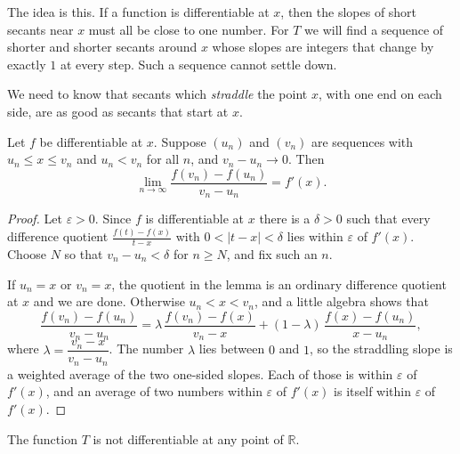 The idea is this.  If a function is differentiable at $x$, then the slopes of short secants near $x$ must all be close to one number.  For $T$ we will find a sequence of shorter and shorter secants around $x$ whose slopes are integers that change by exactly $1$ at every step.  Such a sequence cannot settle down.

We need to know that secants which \emph{straddle} the point $x$, with one end on each side, are as good as secants that start at $x$.

\begin{lemma}\label{lem:straddle}
Let $f$ be differentiable at $x$.  Suppose $(u_n)$ and $(v_n)$ are sequences with $u_n \leq x \leq v_n$ and $u_n < v_n$ for all $n$, and $v_n - u_n \to 0$.  Then
\[ \lim_{n \to \infty} \frac{f(v_n) - f(u_n)}{v_n - u_n} = f'(x). \]
\end{lemma}

\begin{proof}
Let $\varepsilon > 0$.  Since $f$ is differentiable at $x$ there is a $\delta > 0$ such that every difference quotient $\frac{f(t) - f(x)}{t - x}$ with $0 < |t - x| < \delta$ lies within $\varepsilon$ of $f'(x)$.  Choose $N$ so that $v_n - u_n < \delta$ for $n \geq N$, and fix such an $n$.

If $u_n = x$ or $v_n = x$, the quotient in the lemma is an ordinary difference quotient at $x$ and we are done.  Otherwise $u_n < x < v_n$, and a little algebra shows that
\[ \frac{f(v_n) - f(u_n)}{v_n - u_n} = \lambda\,\frac{f(v_n) - f(x)}{v_n - x} + (1 - \lambda)\,\frac{f(x) - f(u_n)}{x - u_n}, \]
where $\lambda = \dfrac{v_n - x}{v_n - u_n}$.  The number $\lambda$ lies between $0$ and $1$, so the straddling slope is a weighted average of the two one-sided slopes.  Each of those is within $\varepsilon$ of $f'(x)$, and an average of two numbers within $\varepsilon$ of $f'(x)$ is itself within $\varepsilon$ of $f'(x)$.
\end{proof}

\begin{theorem}\label{thm:takagi}
The function $T$ is not differentiable at any point of $\mathbb{R}$.
\end{theorem}

